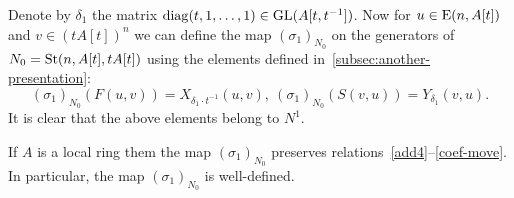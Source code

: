 
Denote by $\delta_1$ the matrix $\mathrm{diag}(t, 1, \ldots, 1) \in \operatorname{GL}(A[t, t^{-1}])$.
Now for $u \in \operatorname{E}(n, A[t])$ and $v \in (tA[t])^n$ we can define the map $(\sigma_1)_{N_0}$ on the generators of $N_{0}=\operatorname{St}(n, A[t], tA[t])$
using the elements defined in~\cref{subsec:another-presentation}:
\begin{equation*}
(\sigma_1)
    _{N_0} (F(u, v)) = X_{\delta_1 \cdot t^{-1}}(u, v),\ (\sigma_1)_{N_0} (S(v, u)) = Y_{\delta_1}(v, u).
\end{equation*}
It is clear that the above elements belong to $N^1$.

\begin{prop}
    If $A$ is a local ring them the map $(\sigma_1)_{N_0}$ preserves relations~\eqref{add4}--\eqref{coef-move}.
    In particular, the map $(\sigma_1)_{N_0}$ is well-defined.
\end{prop}
